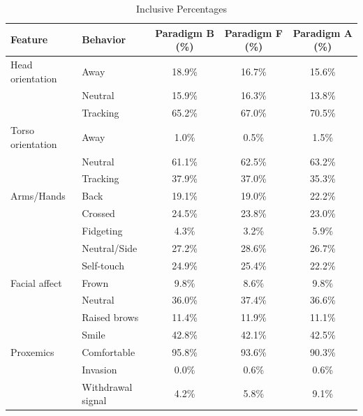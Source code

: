 \begin{table}[ht]
\centering
\caption{Inclusive Percentages}
\label{tab:inc_pct}
\begin{tabular}{llccc}
\toprule
Feature & Behavior & Paradigm B (\%) & Paradigm F (\%) & Paradigm A (\%) \\
\midrule
Head orientation & Away & 18.9\% & 16.7\% & 15.6\% \\
 & Neutral & 15.9\% & 16.3\% & 13.8\% \\
 & Tracking & 65.2\% & 67.0\% & 70.5\% \\
\midrule
Torso orientation & Away & 1.0\% & 0.5\% & 1.5\% \\
 & Neutral & 61.1\% & 62.5\% & 63.2\% \\
 & Tracking & 37.9\% & 37.0\% & 35.3\% \\
\midrule
Arms/Hands & Back & 19.1\% & 19.0\% & 22.2\% \\
 & Crossed & 24.5\% & 23.8\% & 23.0\% \\
 & Fidgeting & 4.3\% & 3.2\% & 5.9\% \\
 & Neutral/Side & 27.2\% & 28.6\% & 26.7\% \\
 & Self-touch & 24.9\% & 25.4\% & 22.2\% \\
\midrule
Facial affect & Frown & 9.8\% & 8.6\% & 9.8\% \\
 & Neutral & 36.0\% & 37.4\% & 36.6\% \\
 & Raised brows & 11.4\% & 11.9\% & 11.1\% \\
 & Smile & 42.8\% & 42.1\% & 42.5\% \\
\midrule
Proxemics & Comfortable & 95.8\% & 93.6\% & 90.3\% \\
 & Invasion & 0.0\% & 0.6\% & 0.6\% \\
 & Withdrawal signal & 4.2\% & 5.8\% & 9.1\% \\
\midrule
\bottomrule
\end{tabular}
\end{table}

